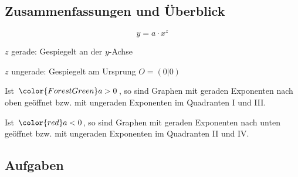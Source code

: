 

\subsection{Zusammenfassungen und Überblick}

$$y = a\cdot{}x^z$$

$z$ gerade: Gespiegelt an der $y$-Achse

$z$ ungerade: Gespiegelt am Ursprung $O=(0|0)$

Ist ${\color{ForestGreen}a>0}$, so sind Graphen mit
geraden Exponenten nach oben geöffnet bzw. mit ungeraden Exponenten im
Quadranten I und III.

Ist ${\color{red}a<0}$, so sind Graphen mit
geraden Exponenten nach unten geöffnet bzw. mit ungeraden Exponenten
im Quadranten II und IV.




\subsection*{Aufgaben}

\newpage

